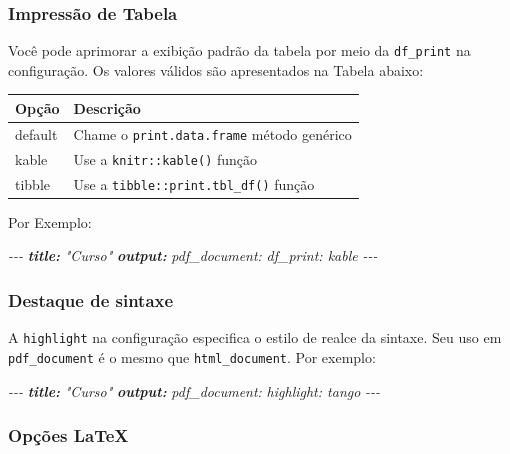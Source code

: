 \documentclass[
]{book}
\newenvironment{Shaded}{\begin{snugshade}}{\end{snugshade}}
\newcommand{\AnnotationTok}[1]{\textcolor[rgb]{0.56,0.35,0.01}{\textbf{\textit{#1}}}}
\newcommand{\CommentTok}[1]{\textcolor[rgb]{0.56,0.35,0.01}{\textit{#1}}}
\begin{document}
\hypertarget{impressuxe3o-de-tabela}{%
\subsubsection{Impressão de Tabela}\label{impressuxe3o-de-tabela}}

Você pode aprimorar a exibição padrão da tabela por meio da \texttt{df\_print} na configuração. Os valores válidos são apresentados na Tabela abaixo:

\begin{longtable}[]{@{}ll@{}}
\toprule
Opção & Descrição\tabularnewline
\midrule
\endhead
default & Chame o \texttt{print.data.frame} método genérico\tabularnewline
kable & Use a \texttt{knitr::kable()} função\tabularnewline
tibble & Use a \texttt{tibble::print.tbl\_df()} função\tabularnewline
\bottomrule
\end{longtable}

Por Exemplo:

\begin{Shaded}
\begin{Highlighting}[]
\CommentTok{{-}{-}{-}}
\AnnotationTok{title:}\CommentTok{ "Curso"}
\AnnotationTok{output:}
\CommentTok{  pdf\_document:}
\CommentTok{    df\_print: kable}
\CommentTok{{-}{-}{-}}
\end{Highlighting}
\end{Shaded}

\hypertarget{destaque-de-sintaxe}{%
\subsubsection{Destaque de sintaxe}\label{destaque-de-sintaxe}}

A \texttt{highlight} na configuração especifica o estilo de realce da sintaxe. Seu uso em \texttt{pdf\_document} é o mesmo que \texttt{html\_document}. Por exemplo:

\begin{Shaded}
\begin{Highlighting}[]
\CommentTok{{-}{-}{-}}
\AnnotationTok{title:}\CommentTok{ "Curso"}
\AnnotationTok{output:}
\CommentTok{  pdf\_document:}
\CommentTok{    highlight: tango}
\CommentTok{{-}{-}{-}}
\end{Highlighting}
\end{Shaded}

\hypertarget{opuxe7uxf5es-latex}{%
\subsubsection{Opções LaTeX}\label{opuxe7uxf5es-latex}}
\end{document}
